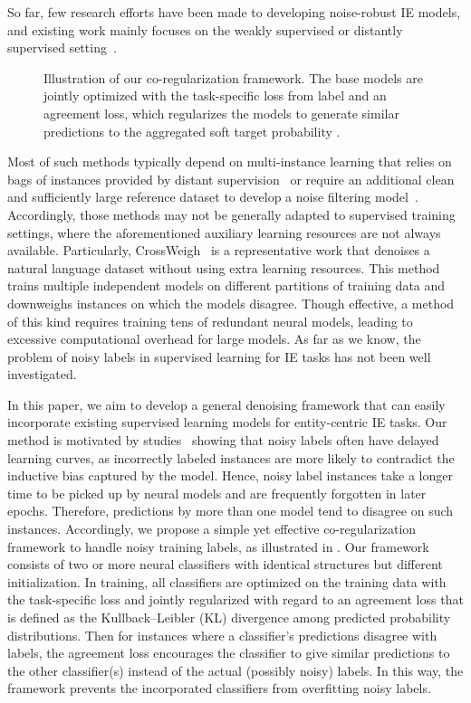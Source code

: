 \documentclass[11pt]{article}
\begin{document}
So far, few research efforts have been made to developing noise-robust IE models,
and existing work mainly focuses on the weakly supervised or distantly supervised setting~\cite{Surdeanu2012MultiinstanceML,Ratner2016DataPC,huang2019self,mayhew2019named}.
\begin{figure}[t!]
    \centering
\caption{Illustration of our co-regularization framework. The base models are jointly optimized with the task-specific loss from label  and an agreement loss, which regularizes the models to generate similar predictions to the aggregated soft target probability .
}\label{fig:overview}
\end{figure}
Most of such methods typically depend on multi-instance learning that relies on bags of instances provided by distant supervision~\cite{Surdeanu2012MultiinstanceML,Zeng2015DistantSF, Ratner2016DataPC} or require an additional clean and sufficiently large reference dataset to develop a noise filtering model~\cite{Qin2018RobustDS}.
Accordingly, those methods may not be generally adapted to supervised training settings, where the aforementioned auxiliary learning resources are not always available.
Particularly, CrossWeigh~\cite{Wang2019CrossWeighTN} is a representative work that denoises a natural language dataset without using extra learning resources.
This method trains multiple independent models on different partitions of training data and downweighs instances on which the models disagree.
Though effective, a method of this kind requires training tens of redundant neural models, leading to excessive computational overhead for large models.
As far as we know, the problem of noisy labels in supervised learning for IE tasks has not been well investigated.

In this paper, we aim to develop a general denoising framework that can easily incorporate existing supervised learning models for entity-centric IE tasks.
Our method is motivated by studies~\cite{Arpit2017ACL,Toneva2019AnES} showing that noisy labels often have delayed learning curves, as incorrectly labeled instances are more likely to contradict the inductive bias captured by the model.
Hence, noisy label instances take a longer time to be picked up by neural models and are frequently forgotten in later epochs.
Therefore, predictions by more than one model tend to disagree on such instances.
Accordingly, we propose a simple yet effective co-regularization framework to handle noisy training labels, as illustrated in .
Our framework consists of two or more neural classifiers with identical structures but different initialization.
In training, all classifiers are optimized on the training data with the task-specific loss and jointly regularized with regard to an agreement loss that is defined as the Kullback–Leibler (KL) divergence among predicted probability distributions.
Then for instances where a classifier's predictions disagree with labels, the agreement loss encourages the classifier to give similar predictions to the other classifier(s) instead of the actual (possibly noisy) labels.
In this way, the framework prevents the incorporated classifiers from overfitting noisy labels. 
\end{document}
